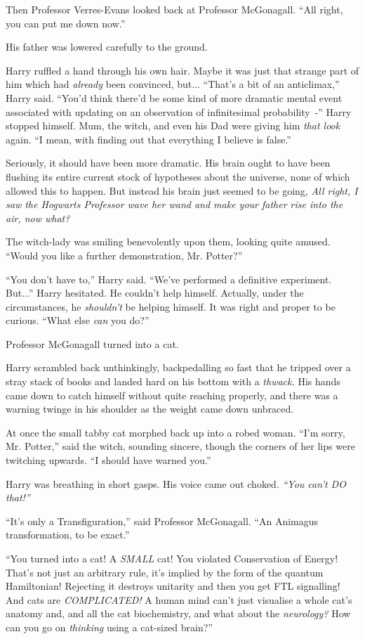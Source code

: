 Then Professor Verres-Evans looked back at Professor McGonagall. ``All right, you can put me down now.''

His father was lowered carefully to the ground.

Harry ruffled a hand through his own hair. Maybe it was just that strange part of him which had \emph{already} been convinced, but... ``That's a bit of an anticlimax,'' Harry said. ``You'd think there'd be some kind of more dramatic mental event associated with updating on an observation of infinitesimal probability~-'' Harry stopped himself. Mum, the witch, and even his Dad were giving him \emph{that look} again. ``I mean, with finding out that everything I believe is false.''

Seriously, it should have been more dramatic. His brain ought to have been flushing its entire current stock of hypotheses about the universe, none of which allowed this to happen. But instead his brain just seemed to be going, \emph{All right, I saw the Hogwarts Professor wave her wand and make your father rise into the air, now what?}

The witch-lady was smiling benevolently upon them, looking quite amused. ``Would you like a further demonstration, Mr. Potter?''

``You don't have to,'' Harry said. ``We've performed a definitive experiment. But...'' Harry hesitated. He couldn't help himself. Actually, under the circumstances, he \emph{shouldn't} be helping himself. It was right and proper to be curious. ``What else \emph{can} you do?''

Professor McGonagall turned into a cat.

Harry scrambled back unthinkingly, backpedalling so fast that he tripped over a stray stack of books and landed hard on his bottom with a \emph{thwack.} His hands came down to catch himself without quite reaching properly, and there was a warning twinge in his shoulder as the weight came down unbraced.

At once the small tabby cat morphed back up into a robed woman. ``I'm sorry, Mr. Potter,'' said the witch, sounding sincere, though the corners of her lips were twitching upwards. ``I should have warned you.''

Harry was breathing in short gasps. His voice came out choked. \emph{``You can't DO that!''}

``It's only a Transfiguration,'' said Professor McGonagall. ``An Animagus transformation, to be exact.''

``You turned into a cat! A \emph{SMALL} cat! You violated Conservation of Energy! That's not just an arbitrary rule, it's implied by the form of the quantum Hamiltonian! Rejecting it destroys unitarity and then you get FTL signalling! And cats are \emph{COMPLICATED!} A human mind can't just visualise a whole cat's anatomy and, and all the cat biochemistry, and what about the \emph{neurology?} How can you go on \emph{thinking} using a cat-sized brain?''

